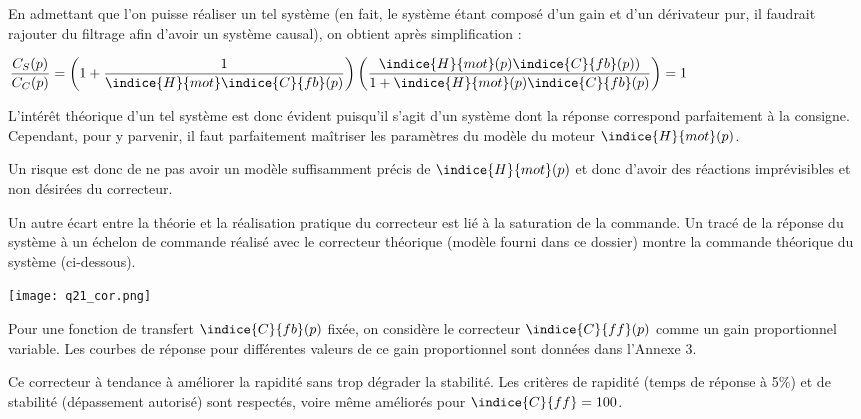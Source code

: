 \ifprof
\begin{corrige}
En admettant que l’on puisse réaliser un tel système (en fait, le système étant composé d’un gain et d’un dérivateur pur, il faudrait rajouter du filtrage afin d’avoir un système causal), on obtient après simplification :
 
$\dfrac{C_S (p)}{C_C (p)}=\left(1+\dfrac{1}{\indice{H}{mot}\indice{C}{fb} (p)}\right)\left(\dfrac{\indice{H}{mot} (p)\indice{C}{fb} (p))}{1+\indice{H}{mot} (p)\indice{C}{fb} (p)}\right)=1$

L’intérêt théorique d’un tel système est donc évident puisqu’il s’agit d’un système dont la réponse correspond parfaitement à la consigne.
Cependant, pour y parvenir, il faut parfaitement maîtriser les paramètres du modèle du moteur $\indice{H}{mot} (p)$.

Un risque est donc de ne pas avoir un modèle suffisamment précis de $\indice{H}{mot} (p)$ et donc d’avoir des réactions imprévisibles et non désirées du correcteur.

Un autre  écart entre la théorie et la réalisation pratique du correcteur  est lié à la saturation de la commande. Un tracé de la réponse du système à un échelon de commande réalisé avec le correcteur théorique (modèle fourni dans ce dossier) montre la commande théorique du système (ci-dessous).

\begin{center}
\texttt{[image: q21\_cor.png]}
\end{center}



\end{corrige}
\else
\fi

Pour une fonction de transfert $\indice{C}{fb} (p)$ fixée, on considère le correcteur $\indice{C}{ff}(p)$ comme un gain
proportionnel variable. Les courbes de réponse pour différentes valeurs de ce gain proportionnel
sont données dans l'Annexe 3.

\ifprof
\begin{corrige}
 Ce correcteur à tendance à améliorer la rapidité sans trop dégrader la stabilité. Les critères de rapidité (temps de réponse à 5\%) et de stabilité (dépassement autorisé) sont respectés, voire même améliorés pour $\indice{C}{ff}  = 100$.
\end{corrige}
\else
\fi
